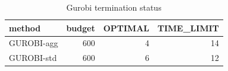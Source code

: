 \begin{table}[htbp]
\centering
\small
\caption{Gurobi termination status}
\label{tab:E3_long_runs_gurobi_status}
\begin{tabular}{lrrr}
\toprule
method & budget & OPTIMAL & TIME\_LIMIT \\
\midrule
GUROBI-agg & 600 & 4 & 14 \\
GUROBI-std & 600 & 6 & 12 \\
\bottomrule
\end{tabular}
\end{table}
